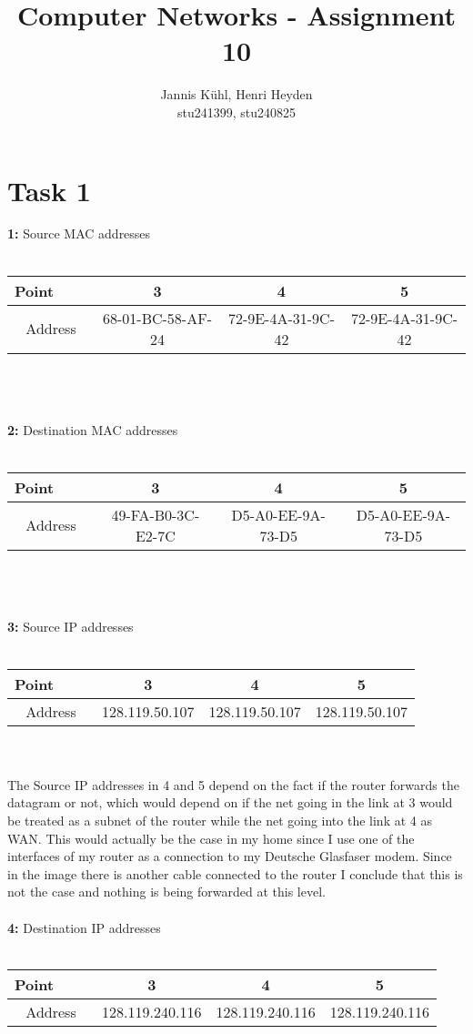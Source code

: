 \documentclass[12pt, a4paper]{article}
\title{Computer Networks - Assignment 10}
\author{Jannis Kühl, Henri Heyden\\ \small stu241399, stu240825}
\date{}
\begin{document}
\maketitle
\section*{Task 1}
\textbf{1:} Source MAC addresses\\ \\
    \begin{tabular}{||c c c c||} 
     \hline
     Point\ \ \ \ \vline & 3 & 4 & 5 \\ [0.5ex] 
     \hline
     Address \vline & 68-01-BC-58-AF-24 & 72-9E-4A-31-9C-42 & 72-9E-4A-31-9C-42 \\ 
     \hline\hline
    \end{tabular} \\ \\ \\
\textbf{2:} Destination MAC addresses\\ \\
    \begin{tabular}{||c c c c||} 
     \hline
     Point\ \ \ \ \vline & 3 & 4 & 5 \\ [0.5ex] 
     \hline
     Address \vline & 49-FA-B0-3C-E2-7C & D5-A0-EE-9A-73-D5 & D5-A0-EE-9A-73-D5 \\ 
     \hline\hline
    \end{tabular} \\ \\ \\
\textbf{3:} Source IP addresses\\ \\
    \begin{tabular}{||c c c c||} 
     \hline
     Point\ \ \ \ \vline & 3 & 4 & 5 \\ [0.5ex] 
     \hline
     Address \vline & 128.119.50.107 & 128.119.50.107 & 128.119.50.107 \\ 
     \hline\hline
    \end{tabular} \\ \\
The Source IP addresses in 4 and 5 depend on the fact if the router forwards the datagram or not, which would depend on if the net going in the link at 3 would be treated as a subnet of the router while the net going into the link at 4 as WAN. This would actually be the case in my home since I use one of the interfaces of my router as a connection to my Deutsche Glasfaser modem. Since in the image there is another cable connected to the router I conclude that this is not the case and nothing is being forwarded at this level. \\ \\
\textbf{4:} Destination IP addresses\\ \\
    \begin{tabular}{||c c c c||} 
     \hline
     Point\ \ \ \ \vline & 3 & 4 & 5 \\ [0.5ex] 
     \hline
     Address \vline & 128.119.240.116 & 128.119.240.116 & 128.119.240.116 \\ 
     \hline\hline
    \end{tabular} \\ \\ \\
\end{document}
